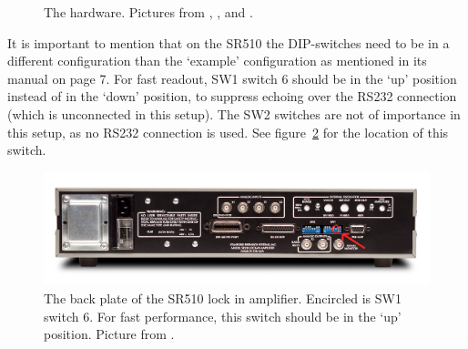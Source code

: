 \begin{figure}[h!tb]
	\begin{center}
		\qquad
		\qquad
		\caption{The hardware. Pictures from \cite{PI}, \cite{SR}, and \cite{prologix}.}
		\label{fig:hardware}
	\end{center}
\end{figure}

It is important to mention that on the SR510 the DIP-switches need to be in a different configuration than the `example' configuration as mentioned in its manual on page 7. For fast readout, SW1 switch 6 should be in the `up' position instead of in the `down' position, to suppress echoing over the RS232 connection (which is unconnected in this setup). The SW2 switches are not of importance in this setup, as no RS232 connection is used. See figure~\ref{fig:SR510_back} for the location of this switch.

\begin{figure}[h!tb]
 \begin{center}
  \includegraphics[width=\textwidth]{figures/SR510_Rear_circle.jpg}
  \caption{The back plate of the SR510 lock in amplifier. Encircled is SW1 switch 6. For fast performance, this switch should be in the `up' position. Picture from \cite{SR}.}
  \label{fig:SR510_back}
 \end{center}
\end{figure}


